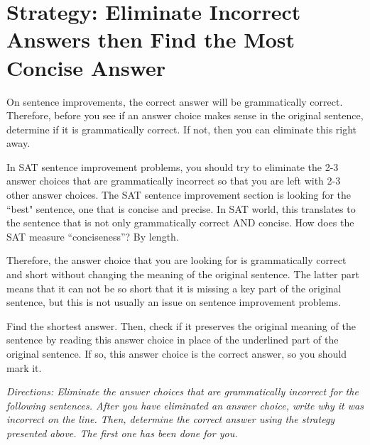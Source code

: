 \section{Strategy: Eliminate Incorrect Answers then Find the Most Concise Answer}

On sentence improvements, the correct answer will be grammatically correct. Therefore, before
you see if an answer choice makes sense in the original sentence, determine if it is grammatically
correct. If not, then you can eliminate this right away.

In SAT sentence improvement problems, you should try to eliminate the 2-3 answer choices that are grammatically incorrect so that you are left with 2-3 other answer choices. The SAT sentence improvement section is looking for the ``best" sentence, one that is concise and precise. In SAT world, this translates to the sentence that is not only grammatically correct AND concise. How does the SAT measure ``conciseness''? By length.

\bigskip
Therefore, the answer choice that you are looking for is grammatically correct and short without changing the meaning of the original sentence. The latter part means that it can not be so short that it is missing a key part of the original sentence,
but this is not usually an issue on sentence improvement problems.

\bigskip
Find the shortest answer. Then, check if it preserves the original meaning of the sentence by reading this answer choice in place of the underlined part of the original sentence. If so, this answer choice is the correct answer, so you should mark it.

\bigskip
\textit{Directions: Eliminate the answer choices that are grammatically incorrect for the following sentences. After you have eliminated an answer choice, write why it was incorrect on the line. Then, determine the correct answer using the strategy presented above. The first one has been done for you.}


